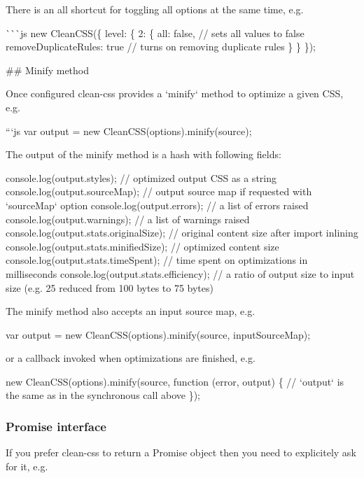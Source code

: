 There is an {\ttfamily all} shortcut for toggling all options at the same time, e.\+g.

\`{}\`{}\`{}js new Clean\+C\+SS(\{ level\+: \{ 2\+: \{ all\+: false, // sets all values to {\ttfamily false} remove\+Duplicate\+Rules\+: true // turns on removing duplicate rules \} \} \}); 
\begin{DoxyCode}
## Minify method

Once configured clean-css provides a `minify` method to optimize a given CSS, e.g.

```js
var output = new CleanCSS(options).minify(source);
\end{DoxyCode}


The output of the {\ttfamily minify} method is a hash with following fields\+:


\begin{DoxyCode}
console.log(output.styles); // optimized output CSS as a string
console.log(output.sourceMap); // output source map if requested with `sourceMap` option
console.log(output.errors); // a list of errors raised
console.log(output.warnings); // a list of warnings raised
console.log(output.stats.originalSize); // original content size after import inlining
console.log(output.stats.minifiedSize); // optimized content size
console.log(output.stats.timeSpent); // time spent on optimizations in milliseconds
console.log(output.stats.efficiency); // a ratio of output size to input size (e.g. 25%
       reduced from 100 bytes to 75 bytes)
\end{DoxyCode}


The {\ttfamily minify} method also accepts an input source map, e.\+g.


\begin{DoxyCode}
var output = new CleanCSS(options).minify(source, inputSourceMap);
\end{DoxyCode}


or a callback invoked when optimizations are finished, e.\+g.


\begin{DoxyCode}
new CleanCSS(options).minify(source, function (error, output) \{
  // `output` is the same as in the synchronous call above
\});
\end{DoxyCode}


\subsubsection*{Promise interface}

If you prefer clean-\/css to return a Promise object then you need to explicitely ask for it, e.\+g.


